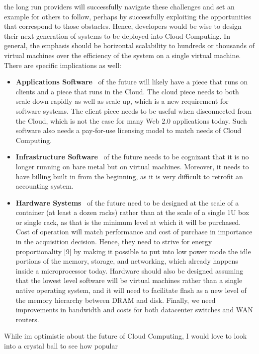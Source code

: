 the long run providers will successfully navigate these challenges and set an example for others to follow, perhaps by
successfully exploiting the opportunities that correspond to those obstacles.
Hence, developers would be wise to design their next generation of systems to be deployed into Cloud Computing. In 
general, the emphasis should be horizontal scalability to hundreds or thousands of virtual machines over the
efficiency of the system on a single virtual machine.\\
There are specific implications as well:
\begin{itemize}
  \item {\bf Applications Software} \textendash\ of the future will likely have a piece that runs on clients and a 
    piece that runs in the
    Cloud. The cloud piece needs to both scale down rapidly as well as scale up, which is a new requirement for
    software systems. The client piece needs to be useful when disconnected from the Cloud, which is not the case
    for many Web 2.0 applications today. Such software also needs a pay-for-use licensing model to match needs
    of Cloud Computing.
  \item {\bf Infrastructure Software} \textendash\ of the future needs to be cognizant that it is no longer running
    on bare metal but on virtual machines. Moreover, it needs to have billing built in from the beginning, as it is 
    very difficult to retrofit an accounting system.
  \item {\bf Hardware Systems} \textendash\ of the future need to be designed at the scale of a container (at 
    least a dozen racks) rather than at the scale of a single 1U box or single rack, as that is the minimum level at 
    which it will be purchased. Cost of operation will match performance and cost of purchase in importance in the 
    acquisition decision. Hence, they need to strive for energy proportionality [9] by making it possible to put 
    into low power mode the idle portions of the memory, storage, and networking, which already happens inside a 
    microprocessor today. Hardware should also be designed assuming that the lowest level software will be virtual 
    machines rather than a single native operating system, and it will need to facilitate flash as a new level of 
    the memory hierarchy between DRAM and disk. Finally, we need improvements in bandwidth and costs for both datacenter
     switches and WAN routers.
\end{itemize}
While im optimistic about the future of Cloud Computing, I would love to look into a crystal ball to see how popular 
